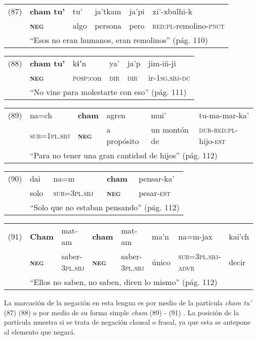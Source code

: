 {\setmainfont{Charis SIL} 

\noindent \begin{tabular}{llllll}
(87) & \textbf{cham tu’} & tu’ & ja’tkam & ja’pi & xi’-xbulhi-k  \\
& \textsc{\textbf{neg}} & algo & persona & pero & \textsc{red:pl}-remolino-\textsc{pnct}\\
& \multicolumn{5}{l}{``Esos no eran humanos, eran remolinos'' (pág. 110)}
\end{tabular} \vspace{0.5cm}

\noindent \begin{tabular}{llllll}
(88) & \textbf{cham tu’} & kɨʼn & ya’ & ja’p & jim-iñ-ji \\
& \textsc{\textbf{neg}} & \textsc{posp}:con & \textsc{dir} & \textsc{dir} & ir-\textsc{1sg.sbj-dc} \\
& \multicolumn{5}{l}{``No vine para molestarte con eso'' (pág. 111)}
\end{tabular} \vspace{0.5cm}

\noindent \begin{tabular}{llllll}
(89) & na=ch & \textbf{cham} & agren & mui’ & tu-ma-mar-ka’ \\
& \textsc{sub=1pl.sbj} & \textsc{\textbf{neg}} & a propósito & un montón de & \textsc{dur-red:pl}-hijo-\textsc{est} \\
& \multicolumn{5}{l}{``Para no tener una gran cantidad de hijos'' (pág. 112)}
\end{tabular} \vspace{0.5cm}

\noindent \begin{tabular}{lllll}
(90) & dai & na=m & \textbf{cham} & pensar-ka’ \\
& solo & \textsc{sub=3pl.sbj} & \textsc{\textbf{neg}} & pesar-\textsc{est} \\
& \multicolumn{4}{l}{``Solo que no estaban pensando'' (pág. 112)}
\end{tabular} \vspace{0.5cm}

{\small
\noindent \begin{tabular}{llllllll}
(91) & \textbf{Cham} & mat-am & \textbf{cham} & mat-am & ma’n & na=m-jax & kai’ch \\
& \textsc{\textbf{neg}} & saber-\textsc{3pl.sbj} & \textsc{\textbf{neg}} & saber-\textsc{3pl.sbj} & único & \textsc{sub=3pl.sbj-advr} & decir \\
& \multicolumn{7}{l}{``Ellos no saben, no saben, dicen lo mismo'' (pág. 112)}
\end{tabular} \vspace{0.5cm} }

}

La marcación de la negación en esta lengua es por medio de la partícula {\setmainfont{Charis SIL} \textit{cham tu’}} (87) (88) o por medio de su forma simple {\setmainfont{Charis SIL} \textit{cham}} (89) - (91) \textcolor{MidnightBlue}{\citep{Tepehuano}}. La posición de la partícula muestra si se trata de negación clausal o frasal, ya que esta se antepone al elemento que negará.